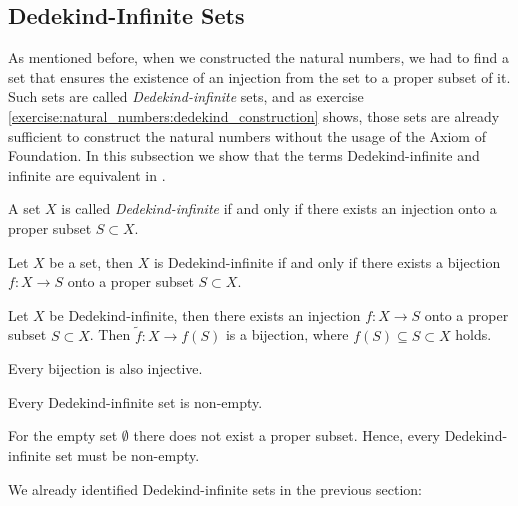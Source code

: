 \subsection{Dedekind-Infinite Sets}

As mentioned before, when we constructed the natural numbers, we had to find a set that ensures the existence of an injection from the set to a proper subset of it. Such sets are called \emph{Dedekind-infinite} sets, and as exercise \ref{exercise:natural_numbers:dedekind_construction} shows, those sets are already sufficient to construct the natural numbers without the usage of the Axiom of Foundation. In this subsection we show that the terms Dedekind-infinite and infinite are equivalent in .

\begin{definition}
    A set $X$ is called \emph{Dedekind-infinite} if and only if there exists an injection onto a proper subset $S\subset X$.
\end{definition}

\begin{remarks}
    \begin{remarkenumerate}
        \item Let $X$ be a set, then $X$ is Dedekind-infinite if and only if there exists a bijection $f\colon X\to S$ onto a proper subset $S\subset X$.
        \begin{miniproof}
            \proofright Let $X$ be Dedekind-infinite, then there exists an injection $f\colon X\to S$ onto a proper subset $S\subset X$. Then $\tilde f\colon X\to f(S)$ is a bijection, where $f(S)\subseteq S\subset X$ holds.

            \proofleft Every bijection is also injective.
        \end{miniproof}
        \item Every Dedekind-infinite set is non-empty.
        \begin{miniproof}
            For the empty set $\emptyset$ there does not exist a proper subset. Hence, every Dedekind-infinite set must be non-empty.
        \end{miniproof}
    \end{remarkenumerate}
\end{remarks}

We already identified Dedekind-infinite sets in the previous section:

